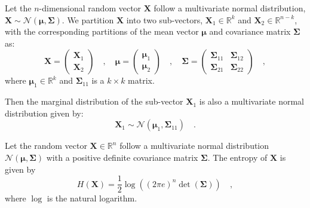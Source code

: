 \documentclass[../../main.tex]{subfiles}
\begin{document}
\pagebreak
\begin{proposition}
    \label{proposition:marginal_distributions_of_a_normal_distribution}
    Let the $n$-dimensional random vector $\bm{X}$ follow a multivariate normal distribution, $\bm{X} \sim \mathcal{N}(\bm{\mu}, \bm{\Sigma})$. We partition $\bm{X}$ into two sub-vectors, $\bm{X}_1 \in \mathbb{R}^k$ and $\bm{X}_2 \in \mathbb{R}^{n-k}$, with the corresponding partitions of the mean vector $\bm{\mu}$ and covariance matrix $\bm{\Sigma}$ as:
    \[
        \bm{X} = \begin{pmatrix} \bm{X}_1 \\ \bm{X}_2 \end{pmatrix} \quad , \quad 
        \bm{\mu} = \begin{pmatrix} \bm{\mu}_1 \\ \bm{\mu}_2 \end{pmatrix} \quad , \quad 
        \bm{\Sigma} = \begin{pmatrix} \bm{\Sigma}_{11} & \bm{\Sigma}_{12} \\ \bm{\Sigma}_{21} & \bm{\Sigma}_{22} \end{pmatrix} \quad ,
    \]
    where $\bm{\mu}_1 \in \mathbb{R}^k$ and $\bm{\Sigma}_{11}$ is a $k \times k$ matrix.
    
    Then the marginal distribution of the sub-vector $\bm{X}_1$ is also a multivariate normal distribution given by:
    \[
        \bm{X}_1 \sim \mathcal{N}(\bm{\mu}_1, \bm{\Sigma}_{11}) \quad .
    \]
\end{proposition}

\begin{proposition}
    Let the random vector $\bm{X} \in \mathbb{R}^n$ follow a multivariate normal distribution $\mathcal{N}(\bm{\mu}, \bm{\Sigma})$ with a positive definite covariance matrix $\bm{\Sigma}$. The entropy of $\bm{X}$ is given by
    \[
        H(\bm{X}) = \frac{1}{2} \log\left( (2\pi e)^n \det(\bm{\Sigma}) \right) \quad,
    \]
    where $\log$ is the natural logarithm.
\end{proposition}
\end{document}
